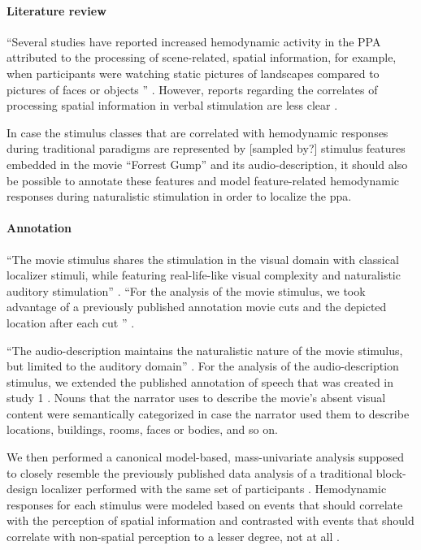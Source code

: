 \paragraph{Literature review}

``Several studies have reported increased hemodynamic activity in the PPA
attributed to the processing of scene-related, spatial information, for example,
when participants were watching static pictures of landscapes compared to
pictures of faces or objects \citep{epstein1998ppa,
epstein1999parahippocampal}'' \citep{haeusler2022processing}.
However, reports regarding the correlates of processing spatial information in
verbal stimulation are less clear \citep{aziz2008modulation}.

In case the stimulus classes that are correlated with hemodynamic responses
during traditional paradigms are represented by [sampled by?] stimulus features
embedded in the movie ``Forrest Gump'' and its audio-description, it should also
be possible to annotate these features and model feature-related hemodynamic
responses during naturalistic stimulation in order to localize the \ac{ppa}.


\paragraph{Annotation}

``The movie stimulus shares the stimulation in the visual domain with classical
localizer stimuli, while featuring real-life-like visual complexity and
naturalistic auditory stimulation'' \citep{haeusler2022processing}.
``For the analysis of the movie stimulus, we took advantage of a previously
published annotation movie cuts and the depicted location after each cut
\citep{haeusler2016cutanno}'' \citep{haeusler2022processing}.

``The audio-description maintains the naturalistic nature of the movie stimulus,
but limited to the auditory domain'' \citep{haeusler2022processing}.
For the analysis of the audio-description stimulus, we extended the published
annotation of speech that was created in study 1 \citep{haeusler2021speechanno}.
%
Nouns that the narrator uses to describe the movie's absent visual content were
semantically categorized in case the narrator used them to describe locations,
buildings, rooms, faces or bodies, and so on.

We then performed a canonical model-based, mass-univariate analysis supposed to
closely resemble the previously published data analysis of a traditional
block-design localizer performed with the same set of participants
\citep{sengupta2016extension}.
Hemodynamic responses for each stimulus were modeled based on events that should
correlate with the perception of spatial information and contrasted with events
that should correlate with non-spatial perception to a lesser degree, not at all
\citep{haeusler2022processing}.


